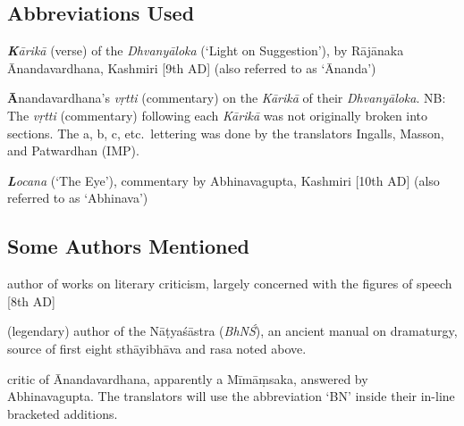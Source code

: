 \documentclass[10pt]{article}
\begin{document}
\subsection{Abbreviations Used}

\begin{description}
	\setlength{\itemsep}{-0.25em}

	\item[K] \textit{\textbf{K}ārikā} (verse) of the \textit{Dhvanyāloka} (`Light on Suggestion'),
	      by Rājānaka \\ Ānandavardhana, Kashmiri [9th AD] (also referred to as `Ānanda')%

	\item[A] \textbf{Ā}nandavardhana's \textit{vṛtti} (commentary) on the \textit{Kārikā} of their \textit{Dhvanyāloka}. NB: The \textit{vṛtti} (commentary) following each \textit{Kārikā} was not originally broken into sections. The a, b, c, etc.\ lettering was done by the translators Ingalls, Masson, and Patwardhan (IMP).

	\item[L] \textit{\textbf{L}ocana} (`The Eye'), commentary by Abhinavagupta, Kashmiri [10th AD]  (also referred to as `Abhinava')
\end{description}


\subsection{Some Authors Mentioned}


\begin{description}
	\setlength{\itemsep}{-0.25em}

	\item[Bhāmaha] author of works on literary criticism, largely concerned with the figures of speech [8th AD]

	\item[Bharata] (legendary) author of the Nāṭyaśāstra (\textit{BhNŚ}), an ancient manual on dramaturgy, source of first eight sthāyibhāva and rasa noted above.

	\item[Bhaṭṭanāyaka] critic of Ānandavardhana, apparently a Mīmāṃsaka, answered by Abhinavagupta. The translators will use the abbreviation `BN' inside their in-line bracketed additions.

\end{description}
\end{document}
